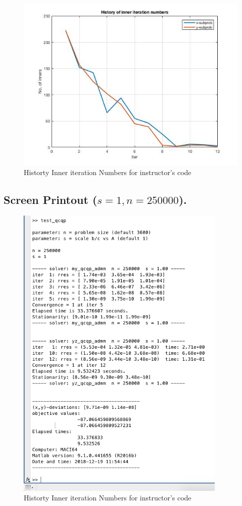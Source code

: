 \begin{figure}[H]
\centering
\includegraphics[width=12cm]{F_11/F_1_4.jpg}
\caption{Historty Inner iteration Numbers for instructor's code}
\end{figure}
\subsection{Screen Printout ($s=1,n=250000$).}
\begin{figure}[H]
\centering
\includegraphics[width=10cm]{F_11/F_1_1.png}
\caption{Historty Inner iteration Numbers for instructor's code}
\end{figure}


